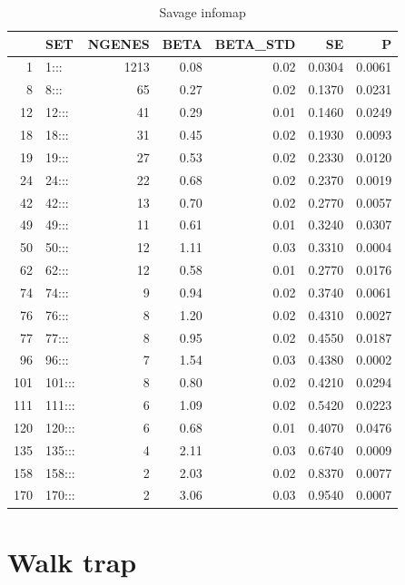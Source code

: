 \begin{table}[ht]
\centering
\begin{tabular}{rlrrrrr}
  \hline
 & SET & NGENES & BETA & BETA\_STD & SE & P \\ 
  \hline
1 & 1::: & 1213 & 0.08 & 0.02 & 0.0304 & 0.0061 \\ 
  8 & 8::: & 65 & 0.27 & 0.02 & 0.1370 & 0.0231 \\ 
  12 & 12::: & 41 & 0.29 & 0.01 & 0.1460 & 0.0249 \\ 
  18 & 18::: & 31 & 0.45 & 0.02 & 0.1930 & 0.0093 \\ 
  19 & 19::: & 27 & 0.53 & 0.02 & 0.2330 & 0.0120 \\ 
  24 & 24::: & 22 & 0.68 & 0.02 & 0.2370 & 0.0019 \\ 
  42 & 42::: & 13 & 0.70 & 0.02 & 0.2770 & 0.0057 \\ 
  49 & 49::: & 11 & 0.61 & 0.01 & 0.3240 & 0.0307 \\ 
  50 & 50::: & 12 & 1.11 & 0.03 & 0.3310 & 0.0004 \\ 
  62 & 62::: & 12 & 0.58 & 0.01 & 0.2770 & 0.0176 \\ 
  74 & 74::: &  9 & 0.94 & 0.02 & 0.3740 & 0.0061 \\ 
  76 & 76::: &  8 & 1.20 & 0.02 & 0.4310 & 0.0027 \\ 
  77 & 77::: &  8 & 0.95 & 0.02 & 0.4550 & 0.0187 \\ 
  96 & 96::: &  7 & 1.54 & 0.03 & 0.4380 & 0.0002 \\ 
  101 & 101::: &  8 & 0.80 & 0.02 & 0.4210 & 0.0294 \\ 
  111 & 111::: &  6 & 1.09 & 0.02 & 0.5420 & 0.0223 \\ 
  120 & 120::: &  6 & 0.68 & 0.01 & 0.4070 & 0.0476 \\ 
  135 & 135::: &  4 & 2.11 & 0.03 & 0.6740 & 0.0009 \\ 
  158 & 158::: &  2 & 2.03 & 0.02 & 0.8370 & 0.0077 \\ 
  170 & 170::: &  2 & 3.06 & 0.03 & 0.9540 & 0.0007 \\ 
   \hline
\end{tabular}
\caption{Savage infomap}
\label{tab:Infomap savage}
\end{table}

\section{Walk trap}

